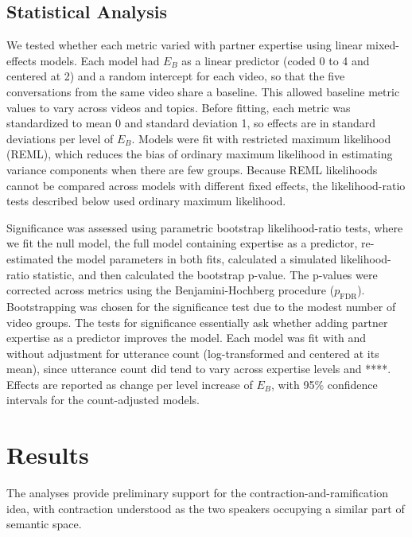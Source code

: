 \documentclass{article}
\begin{document}
\subsection{Statistical Analysis}

We tested whether each metric varied with partner expertise using linear mixed-effects models. Each model had $E_B$ as a linear predictor (coded 0 to 4 and centered at 2) and a random intercept for each video, so that the five conversations from the same video share a baseline. This allowed baseline metric values to vary across videos and topics. Before fitting, each metric was standardized to mean 0 and standard deviation 1, so effects are in standard deviations per level of $E_B$. Models were fit with restricted maximum likelihood (REML), which reduces the bias of ordinary maximum likelihood in estimating variance components when there are few groups. Because REML likelihoods cannot be compared across models with different fixed effects, the likelihood-ratio tests described below used ordinary maximum likelihood.

Significance was assessed using parametric bootstrap likelihood-ratio tests, where we fit the null model, the full model containing expertise as a predictor, re-estimated the model parameters in both fits, calculated a simulated likelihood-ratio statistic, and then calculated the bootstrap p-value. The p-values were corrected across metrics using the Benjamini-Hochberg procedure ($p_{\mathrm{FDR}}$). Bootstrapping was chosen for the significance test due to the modest number of video groups. The tests for significance essentially ask whether adding partner expertise as a predictor improves the model. Each model was fit with and without adjustment for utterance count (log-transformed and centered at its mean), since utterance count did tend to vary across expertise levels and ****. Effects are reported as change per level increase of $E_B$, with 95\% confidence intervals for the count-adjusted models.

\section{Results}

The analyses provide preliminary support for the contraction-and-ramification idea, with contraction understood as the two speakers occupying a similar part of semantic space.
\end{document}
